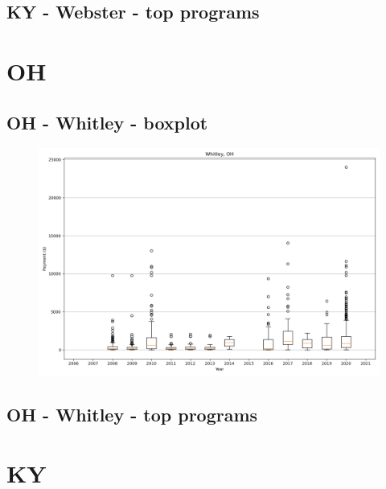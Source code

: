 \subsection*{KY - Webster - top programs}

\newpage
\section*{OH}
\subsection*{OH - Whitley - boxplot}
\begin{figure}[h]
\centering
\includegraphics[width=7in]{../output/boxplots/counties/Whitley-OH_boxplot.png}
\end{figure}


\subsection*{OH - Whitley - top programs}

\newpage
\section*{KY}
